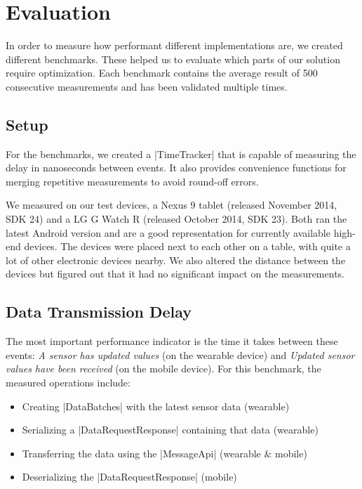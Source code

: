 \section{Evaluation}
\label{sec:evaluation}

In order to measure how performant different implementations are, we created different benchmarks.
These helped us to evaluate which parts of our solution require optimization.
Each benchmark contains the average result of 500 consecutive measurements and has been validated multiple times.

\subsection{Setup}
For the benchmarks, we created a |TimeTracker|\cite{sensordatalogger:timetracker} that is capable of measuring the delay in nanoseconds between events. It also provides convenience functions for merging repetitive measurements to avoid round-off errors.

We measured on our test devices, a Nexus 9 tablet (released November 2014, SDK 24) and a LG G Watch R (released October 2014, SDK 23). Both ran the latest Android version and are a good representation for currently available high-end devices.
The devices were placed next to each other on a table, with quite a lot of other electronic devices nearby.
We also altered the distance between the devices but figured out that it had no significant impact on the measurements.

\subsection{Data Transmission Delay}
The most important performance indicator is the time it takes between these events: \textit{A sensor has updated values} (on the wearable device) and \textit{Updated sensor values have been received} (on the mobile device). For this benchmark, the measured operations include:

\begin{itemize}[noitemsep]
    \item Creating |DataBatches|\cite{sensordatalogger:databatch} with the latest sensor data (wearable)
    \item Serializing a |DataRequestResponse|\cite{sensordatalogger:datarequestresponse} containing that data (wearable)
    \item Transferring the data using the |MessageApi|\cite{androiddocs:messageapi} (wearable \& mobile)
    \item Deserializing the |DataRequestResponse| (mobile)
\end{itemize}

